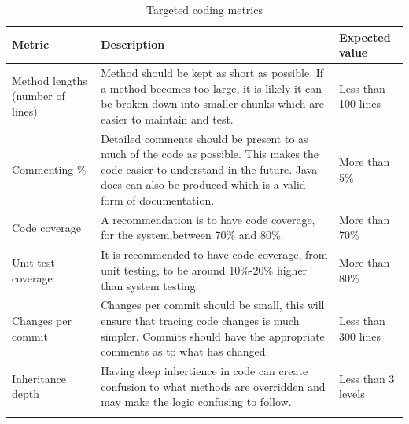 \begin{longtable}{|p{}|p{}|p{}|}
    \hline
    Metric                              & Description                                                                                                                                                                                             & Expected value      \\
    \hline\hline
    Method lengths (number of lines)    & Method should be kept as short as possible. If a method becomes too large, it is likely it can be broken down into smaller chunks which are easier to maintain and test.                                & Less than 100 lines \\
    \hline
    Commenting \%                       & Detailed comments should be present to as much of the code as possible. This makes the code easier to understand in the future. Java docs can also be produced which is a valid form of documentation.  & More than 5\%       \\
    \hline
    Code coverage                       & A recommendation is to have code coverage, for the system,between 70\% and 80\%.                                                                                                                        & More than 70\%      \\
    \hline
    Unit test coverage                  & It is recommended to have code coverage, from unit testing, to be around 10\%-20\% higher than system testing.                                                                                          & More than 80\%      \\
    \hline
    Changes per commit                  & Changes per commit should be small, this will ensure that tracing code changes is much simpler. Commits should have the appropriate comments as to what has changed.                                    & Less than 300 lines \\
    \hline
    Inheritance depth                   & Having deep inhertience in code can create confusion to what methods are overridden and may make the logic confusing to follow.                                                                         & Less than 3 levels  \\
    \hline

    \caption{Targeted coding metrics}
\end{longtable}


